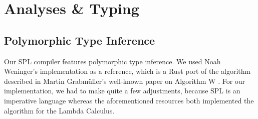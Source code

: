\chapter{Analyses \& Typing}

\section{Polymorphic Type Inference}
Our SPL compiler features polymorphic type inference. We used Noah Weninger's implementation \cite{weninger_2016} as a reference, which is a Rust port of the algorithm described in Martin Grabmüller's well-known paper on Algorithm W \cite{grabmuller}. For our implementation, we had to make quite a few adjustments, because SPL is an imperative language whereas the aforementioned resources both implemented the algorithm for the Lambda Calculus.

